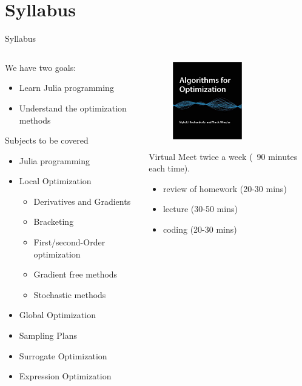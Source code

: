 \documentclass{beamer}
\begin{document}
\section{Syllabus}
\begin{frame}{Syllabus}

    
\begin{columns}

\begin{column}{.6\textwidth}
We have two goals: 
\begin{itemize}
    \item Learn Julia programming
    \item Understand the optimization methods
\end{itemize}
Subjects to be covered
\begin{itemize}
    \item Julia programming
    \item Local Optimization
    \begin{itemize}
        \item Derivatives and Gradients
        \item Bracketing
        \item First/second-Order optimization
        \item Gradient free methods
        \item Stochastic methods
    \end{itemize}
    \item Global Optimization
    \item Sampling Plans
    \item Surrogate Optimization
    \item Expression Optimization

\end{itemize}
\end{column}
\begin{column}{.4\textwidth}
\begin{figure}
\centering
\includegraphics[width=30mm]{Figs/algo_opt.jpg}
\end{figure}
Virtual Meet twice a week (~90 minutes each time).\\
\begin{itemize}
    \item review of homework (20-30 mins)
    \item lecture (30-50 mins)
    \item coding (20-30 mins)
\end{itemize}
\end{column}

\end{columns}

\end{frame}
\end{document}
